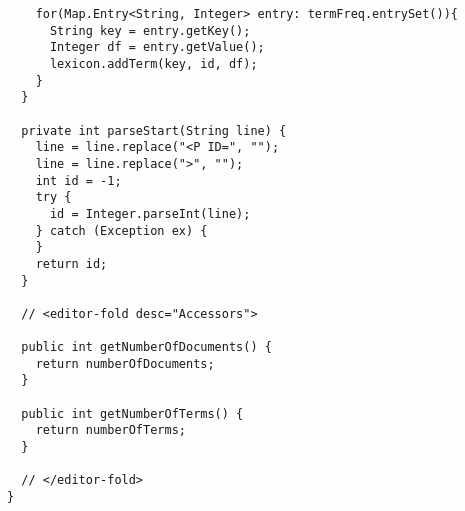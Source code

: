 \documentclass{article}
\begin{document}
\begin{verbatim}
    for(Map.Entry<String, Integer> entry: termFreq.entrySet()){
      String key = entry.getKey();
      Integer df = entry.getValue();
      lexicon.addTerm(key, id, df);
    }
  }

  private int parseStart(String line) {
    line = line.replace("<P ID=", "");
    line = line.replace(">", "");
    int id = -1;
    try {
      id = Integer.parseInt(line);
    } catch (Exception ex) {
    }
    return id;
  }

  // <editor-fold desc="Accessors">

  public int getNumberOfDocuments() {
    return numberOfDocuments;
  }

  public int getNumberOfTerms() {
    return numberOfTerms;
  }

  // </editor-fold>
}
\end{verbatim}
\end{document}
